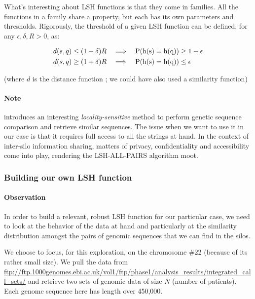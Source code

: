 \documentclass[usletter,11pt,final]{article}
\begin{document}
\vspace{5mm}
What's interesting about LSH functions is that they come in families. All the functions in a family share a property, but each has its own parameters and thresholds. Rigorously, the threshold of a given LSH function can be defined, for any $\epsilon,\delta,R>0$, as: 

\begin{equation}
\begin{aligned}
d(s,q) \le (1 - \delta)R \quad & \Longrightarrow \quad \rm P(h(s)=h(q)) \ge 1-\epsilon\\
d(s,q) \ge (1 + \delta)R \quad & \Longrightarrow \quad \rm P(h(s)=h(q)) \le \epsilon
\end{aligned}
\end{equation}

(where $d$ is the distance function ; we could have also used a similarity function)



\paragraph{Note} \cite{jbuhler} introduces an interesting \textit{locality-sensitive} method to perform genetic sequence comparison and retrieve similar sequences. The issue when we want to use it in our case is that it requires full access to all the strings at hand. In the context of inter-silo information sharing, matters of privacy, confidentiality and accessibility come into play, rendering the \textsc{LSH-ALL-PAIRS} algorithm moot.

\subsubsection{Building our own LSH function}

\paragraph{Observation}

In order to build a relevant, robust LSH function for our particular case, we need to look at the behavior of the data at hand and particularly at the similarity distribution amongst the pairs of genomic sequences that we can find in the silos.

We choose to focus, for this exploration, on the chromosome \#22 (because of its rather small size). We pull the data from \url{ftp://ftp.1000genomes.ebi.ac.uk/vol1/ftp/phase1/analysis_results/integrated_call_sets/} and retrieve two sets of genomic data of size $N$ (number of patients). Each genome sequence here has length over 450,000.
\end{document}
